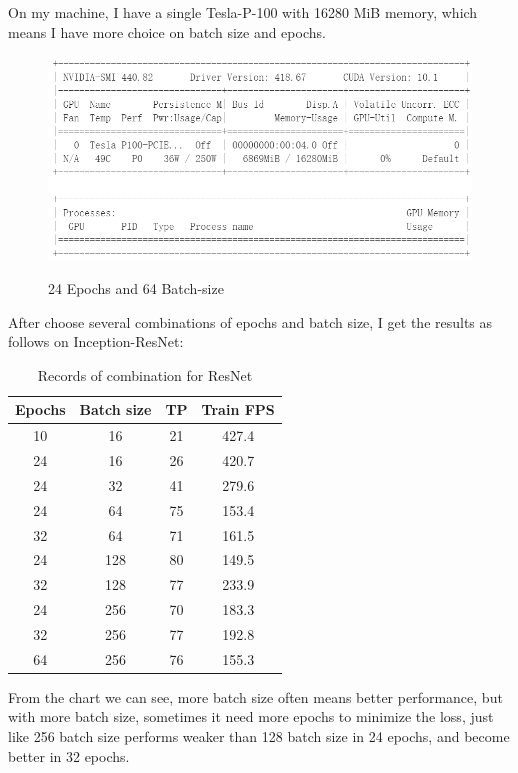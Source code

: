 \documentclass{article}
\begin{document}
On my machine, I have a  single Tesla-P-100 with 16280 MiB memory, which means I have more choice on batch size and epochs. 
\begin{figure}[H]%
  \centering
  \caption{24 Epochs and 64 Batch-size}
  \includegraphics[width=\columnwidth]{IMG/ML实验GPU.png} %
  \label{Fig.RNN} %
\end{figure}
After choose several combinations of epochs and batch size,  I get the results as follows on Inception-ResNet:

\begin{table}[!htbp]
\centering
\caption{Records of combination for ResNet}\label{tab:aStrangeTable}%
\begin{tabular}{cccc}
\toprule
Epochs & Batch size& TP &Train FPS\\
\midrule
10& 16 & 21 & 427.4\\
24& 16& 26 & 420.7\\
24 & 32 & 41 & 279.6\\
24 & 64 & 75 & 153.4\\
32 & 64 & 71 & 161.5\\
24 & 128 & 80 & 149.5\\
32 & 128 & 77 & 233.9\\
24 & 256 & 70  &183.3\\
32 & 256 & 77  &192.8\\
64 & 256 & 76  &155.3\\
\bottomrule
\end{tabular}

\end{table}
From the chart we can see, more batch size often means better performance, but with more batch size, sometimes it need more epochs to minimize the loss, just like 256 batch size performs weaker than 128 batch size in 24 epochs, and become better in 32 epochs.
\end{document}
